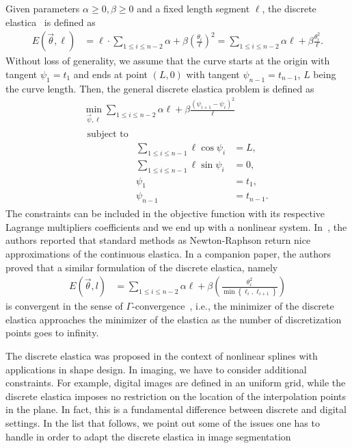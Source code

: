 Given parameters $\alpha \geq 0,\beta \geq 0$ and a fixed length segment $\ell$, the discrete elastica~\cite{bruckstein01discrete} is defined as
\begin{align}
	E(\vec{\theta},\ell) &= \ell \cdot \sum_{1 \leq i \leq n-2}{ \alpha + \beta \left(\frac{\theta_i}{\ell}\right)^2} = \sum_{1 \leq i \leq n-2}{ \alpha \ell + \beta \frac{\theta_i^2}{\ell}}.
	\label{ch3:eq:discrete-elastica}
\end{align}
%
Without loss of generality, we assume that the curve starts at the origin with tangent $\psi_1=t_1$ and ends at point $(L,0)$ with tangent $\psi_{n-1}=t_{n-1}$, $L$ being the curve length. Then, the general discrete elastica problem is defined as
\begin{align*}
	\min_{\vec{\psi},\ell}{ \sum_{1 \leq i \leq n-2 }{ \alpha \ell + \beta \frac{ (\psi_{i+1} - \psi_{i} )^2}{\ell}}}\\
	\begin{array}{rrl}
		\text{subject to}&& \\
		&\displaystyle \sum_{1 \leq i \leq n-1}{\ell\cos \psi_i} &= L, \\[1em]
		&\displaystyle \sum_{1 \leq i \leq n-1}{\ell\sin \psi_i} &= 0, \\[1em]
		&\displaystyle \psi_1 &= t_1, \\[1em]
		&\displaystyle \psi_{n-1} &= t_{n-1}.
	\end{array}
\end{align*}
%
The constraints can be included in the objective function with its respective Lagrange multipliers coefficients and we end up with a nonlinear system. In~\cite{bruckstein01discrete}, the authors reported that standard methods as Newton-Raphson return nice approximations of the continuous elastica. In a companion paper, the authors proved that a similar formulation of the discrete elastica, namely
\begin{align}
	E(\vec{\theta},l) &= \sum_{1 \leq i \leq n-2}{ \alpha \ell + \beta \left( \frac{\theta_i^2}{\min \left\{{\ell_i,\ell_{i+1}} \right\} }\right)}
	\label{ch3:eq:discrete-elastica}
\end{align}
%
is convergent in the sense of $\Gamma$-convergence~\cite{bruckstein01epi}, i.e., the minimizer of the discrete elastica approaches the minimizer of the elastica as the number of discretization points goes to infinity. 

The discrete elastica was proposed in the context of nonlinear splines with applications in shape design. In imaging, we have to consider additional constraints. For example,  digital images are defined in an uniform grid, while the discrete elastica imposes no restriction on the location of the interpolation points in the plane. In fact, this is a fundamental difference between discrete and digital settings. In the list that follows, we point out some of the issues one has to handle in order to adapt the discrete elastica in image segmentation

